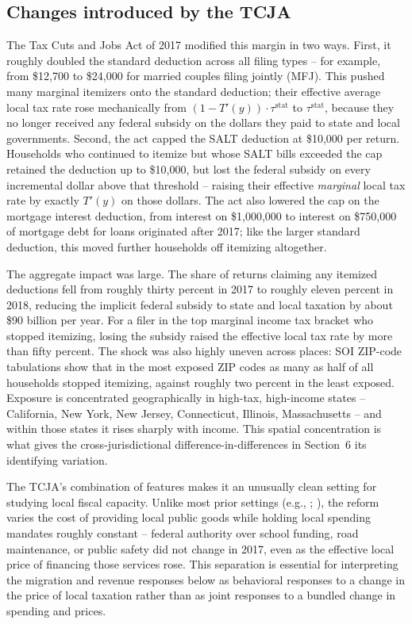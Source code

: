 \documentclass[12pt]{article}
\begin{document}
\subsection*{Changes introduced by the TCJA}

The Tax Cuts and Jobs Act of 2017 modified this margin in two ways. First, it roughly doubled the standard deduction across all filing types -- for example, from \$12{,}700 to \$24{,}000 for married couples filing jointly (MFJ). This pushed many marginal itemizers onto the standard deduction; their effective average local tax rate rose mechanically from $(1-T'(y))\cdot\tau^{\text{stat}}$ to $\tau^{\text{stat}}$, because they no longer received any federal subsidy on the dollars they paid to state and local governments. Second, the act capped the SALT deduction at \$10{,}000 per return. Households who continued to itemize but whose SALT bills exceeded the cap retained the deduction up to \$10{,}000, but lost the federal subsidy on every incremental dollar above that threshold -- raising their effective \emph{marginal} local tax rate by exactly $T'(y)$ on those dollars. The act also lowered the cap on the mortgage interest deduction, from interest on \$1{,}000{,}000 to interest on \$750{,}000 of mortgage debt for loans originated after 2017; like the larger standard deduction, this moved further households off itemizing altogether.

The aggregate impact was large. The share of returns claiming any itemized deductions fell from roughly thirty percent in 2017 to roughly eleven percent in 2018, reducing the implicit federal subsidy to state and local taxation by about \$90 billion per year. For a filer in the top marginal income tax bracket who stopped itemizing, losing the subsidy raised the effective local tax rate by more than fifty percent. The shock was also highly uneven across places: SOI ZIP-code tabulations show that in the most exposed ZIP codes as many as half of all households stopped itemizing, against roughly two percent in the least exposed. Exposure is concentrated geographically in high-tax, high-income states -- California, New York, New Jersey, Connecticut, Illinois, Massachusetts -- and within those states it rises sharply with income. This spatial concentration is what gives the cross-jurisdictional difference-in-differences in Section~6 its identifying variation.

The TCJA's combination of features makes it an unusually clean setting for studying local fiscal capacity. Unlike most prior settings (e.g., \citealt{BayerBlairWhaley2023}; \citealt{Coen-PiraniSieg2019}), the reform varies the cost of providing local public goods while holding local spending mandates roughly constant -- federal authority over school funding, road maintenance, or public safety did not change in 2017, even as the effective local price of financing those services rose. This separation is essential for interpreting the migration and revenue responses below as behavioral responses to a change in the price of local taxation rather than as joint responses to a bundled change in spending and prices.
\end{document}
